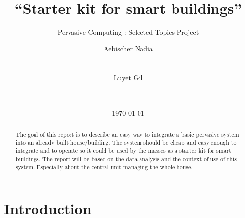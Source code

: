 \documentclass{acm_proc_article-sp}
\begin{document}
\graphicspath{{figures/}}

\title{“Starter kit for smart buildings”}
\subtitle{Pervasive Computing : Selected Topics Project}

%
\author{
\alignauthor 
  Aebischer Nadia
  \\
  \\
  \\
\alignauthor 
  Luyet Gil
  \\
  \\
  \\
}
\date{\today}

\maketitle
\begin{abstract}
The goal of this report is to describe an easy way to integrate a basic pervasive system into an already built house/building. 
The system should be cheap and easy enough to integrate and to operate so it could be used by the masses as a starter kit for smart buildings. 
The report will be based on the data analysis and the context of use of this system. 
Especially about the central unit managing the whole house.
\end{abstract}


\section{Introduction}
\end{document}
